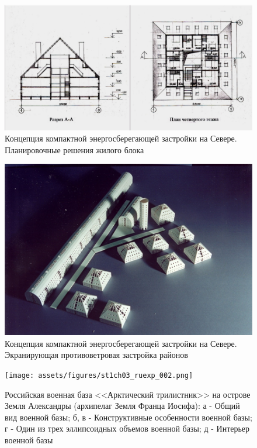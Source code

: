 \begin{figure}
    \centering
    \includegraphics[width=\textwidth]{assets/figures/st1ch03_ruexp_006.png}
    \caption{Концепция компактной энергосберегающей застройки на Севере. Планировочные решения жилого блока}
    \label{fig:st1ch03_ruexp_006}
  \end{figure}


\begin{figure}
    \centering
    \includegraphics[width=\textwidth]{assets/figures/st1ch03_ruexp_007.png}
    \caption{Концепция компактной энергосберегающей застройки на Севере. Экранирующая противоветровая застройка районов}
    \label{fig:st1ch03_ruexp_007}
  \end{figure}

\begin{figure}
  \centering
  \texttt{[image: assets/figures/st1ch03\_ruexp\_002.png]}
  \caption{Российская военная база <<Арктический трилистник>> на острове Земля Александры (архипелаг Земля Франца Иосифа):
  а - Общий вид военной базы; б, в - Конструктивные особенности военной базы; г - Один из трех эллипсоидных объемов военной базы; д - Интерьер военной базы}
  \label{fig:st1ch03_ruexp_002}
\end{figure}

